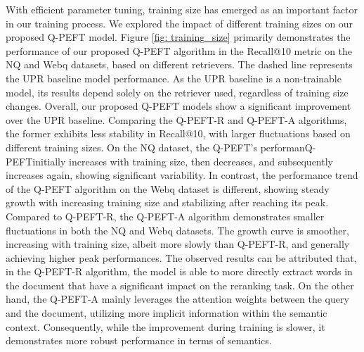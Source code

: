 \documentclass[sigconf,natbib=true,anonymous=false]{acmart}
\begin{document}
With efficient parameter tuning, training size has emerged as an important factor in our training process. We explored the impact of different training sizes on our proposed Q-PEFT model. Figure \ref{fig: training_size} primarily demonstrates the performance of our proposed Q-PEFT algorithm in the Recall@10 metric on the NQ and Webq datasets, based on different retrievers. The dashed line represents the UPR baseline model performance. As the UPR baseline is a non-trainable model, its results depend solely on the retriever used, regardless of training size changes. Overall, our proposed Q-PEFT models show a significant improvement over the UPR baseline. Comparing the Q-PEFT-R and Q-PEFT-A algorithms, the former exhibits less stability in Recall@10, with larger fluctuations based on different training sizes. On the NQ dataset, the Q-PEFT's performanQ-PEFTinitially increases with training size, then decreases, and subsequently increases again, showing significant variability. In contrast, the performance trend of the Q-PEFT algorithm on the Webq dataset is different, showing steady growth with increasing training size and stabilizing after reaching its peak. Compared to Q-PEFT-R, the Q-PEFT-A algorithm demonstrates smaller fluctuations in both the NQ and Webq datasets. The growth curve is smoother, increasing with training size, albeit more slowly than Q-PEFT-R, and generally achieving higher peak performances. The observed results can be attributed that, in the Q-PEFT-R algorithm, the model is able to more directly extract words in the document that have a significant impact on the reranking task. On the other hand, the Q-PEFT-A mainly leverages the attention weights between the query and the document, utilizing more implicit information within the semantic context. Consequently, while the improvement during training is slower, it demonstrates more robust performance in terms of semantics.
\end{document}
